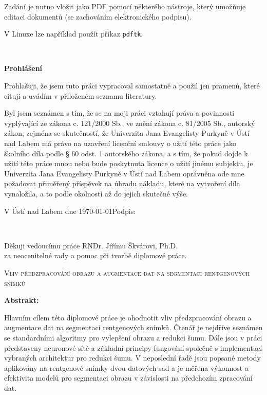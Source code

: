 \documentclass[male,czech,api_ing]{thesis}
\newcommand{\nazevcz}{Vliv předzpracování obrazu a augmentace dat na segmentaci rentgenových snímků}        %
\newcommand{\vedouciDAT}{RNDr. Jiřímu Škvárovi, Ph.D.}
\begin{document}
Zadání je nutno vložit jako PDF pomocí některého nástroje, který umožňuje editaci dokumentů (se zachováním
elektronického podpisu).

V Linuxe lze například použít příkaz \texttt{pdftk}.

\clearpage
\thispagestyle{empty}

\afterpage{\nopagecolor}
~
\clearpage

\thispagestyle{empty} 
{\bfseries Prohlášení}

\vspace{0.5cm}
Prohlašuji, že jsem tuto  práci vypracoval
samostatně a použil
jen pramenů, které cituji a uvádím v přiloženém seznamu literatury.

\vspace{0.5em}

Byl jsem seznámen 
s tím, že se na moji práci vztahují práva a povinnosti vyplývající ze
zákona c. 121/2000 Sb., ve znění zákona c. 81/2005 Sb., autorský zákon, zejména se
skutečností, že Univerzita Jana Evangelisty Purkyně v Ústí nad Labem má právo na uzavření
licenční smlouvy o užití této práce jako školního díla podle § 60 odst. 1 autorského zákona, a
s tím, že pokud dojde k užití této práce mnou nebo bude poskytnuta licence o užití jinému
subjektu, je Univerzita Jana Evangelisty Purkyně v Ústí nad Labem oprávněna ode mne
požadovat přiměřený příspěvek na úhradu nákladu, které na vytvoření díla vynaložila, a to
podle okolností až do jejich skutečné výše.

\vspace{2em}

V Ústí nad Labem dne \today   \hfill Podpis: \makebox[4cm][s]{\dotfill}

\cleardoublepage
\thispagestyle{empty}
~
\vfill

\begin{flushright}
    Děkuji vedoucímu práce {\vedouciDAT}\\ 
    za neocenitelné rady a pomoc při tvorbě diplomové práce.
\end{flushright}

\cleardoublepage

\textsc{\nazevcz}

\textbf{Abstrakt:}

Hlavním cílem této diplomové práce je ohodnotit vliv předzpracování obrazu a augmentace dat na segmentaci rentgenových snímků. Čtenář je nejdříve seznámen se standardními algoritmy pro vylepšení obrazu a redukci šumu. Dále jsou v práci představeny neuronové sítě a základní principy fungování společně s implementací vybraných architektur pro redukci šumu. V neposlední řadě jsou popsané metody aplikovány na rentgenové snímky dvou datových sad a je měřena výkonnost a efektivita modelů pro segmentaci obrazu v závislosti na předchozím zpracování dat.
\end{document}
